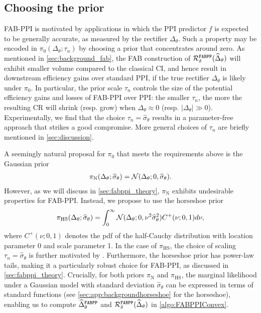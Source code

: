 \subsection{Choosing the prior}\label{sec:fabppi_priors}
FAB-PPI is motivated by applications in which the PPI predictor $f$ is expected to be generally accurate, as measured by the rectifier $\Delta_\theta$.
Such a property may be encoded in $\pi_0(\Delta_\theta; \tau_n)$ by choosing a prior that concentrates around zero.
As mentioned in \cref{sec:background_fab}, the FAB construction of $\mathcal R^{\mathrm{\texttt{FABPP}}}_\delta(\widehat\Delta_\theta)$ will exhibit smaller volume compared to the classical CI, and hence result in downstream efficiency gains over standard PPI, if the true rectifier $\Delta_\theta$ is likely under $\pi_0$.
In particular, the prior scale $\tau_n$ controls the size of the potential efficiency gains and losses of FAB-PPI over PPI: the smaller $\tau_n$, the more the resulting CR will shrink (resp. grow) when $\Delta_\theta \approx 0$ (resp. $|\Delta_\theta| \gg 0$). Experimentally, we find that the choice $\tau_n = \widehat\sigma_\theta$ results in a parameter-free approach that strikes a good compromise. More general choices of $\tau_n$ are briefly mentioned in \cref{sec:discussion}.

A seemingly natural proposal for $\pi_0$ that meets the requirements above is the Gaussian prior
\begin{align}
    \pi_\text{N}(\Delta_\theta; \widehat\sigma_\theta) = \mathcal N(\Delta_\theta; 0, \widehat\sigma_\theta).
    \label{eq:Gaussianprior}
\end{align}
However, as we will discuss in \cref{sec:fabppi_theory}, $\pi_\text{N}$ exhibits undesirable properties for FAB-PPI. Instead, we propose to use the horseshoe prior~\citep{Carvalho2010}
\begin{align}
    \pi_\text{HS}(\Delta_\theta;\widehat\sigma_\theta)=\int_0^\infty \mathcal N(\Delta_\theta;0,\nu^2\widehat\sigma^2_\theta) C^+(\nu; 0,1)d\nu,
    \label{eq:horseshoeprior}
\end{align}
where $C^+(\nu; 0,1)$ denotes the pdf of the half-Cauchy distribution with location parameter 0 and scale parameter 1. In the case of $\pi_\text{HS}$, the choice of scaling $\tau_n = \widehat\sigma_\theta$ is further motivated by \citet[\S3.3]{Piironen2017}. Furthermore,  the horseshoe prior has power-law tails, making it a particularly robust choice for FAB-PPI, as discussed in \cref{sec:fabppi_theory}. Crucially, for both priors $\pi_\text{N}$ and $\pi_\text{HS}$, the marginal likelihood under a Gaussian model with standard deviation $\widehat\sigma_\theta$ can be expressed in terms of standard functions (see \cref{sec:app:backgroundhorseshoe} for the horseshoe), enabling us to compute $\widehat\Delta_\theta^{\mathrm{\texttt{FABPP}}}$ and $\mathcal R^{\mathrm{\texttt{FABPP}}}_\delta(\widehat\Delta_\theta)$ in \cref{algo:FABPPIConvex}.

